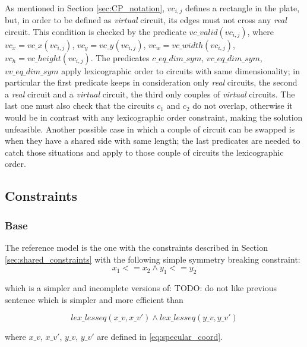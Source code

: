 \hfill \\
As mentioned in Section \ref{sec:CP_notation}, $vc_{i,j}$ defines a rectangle in the plate, but, in order to
be defined as \textit{virtual} circuit, its edges must not cross any \textit{real} circuit.
This condition is checked by the predicate $vc\_valid(vc_{i,j})$, where
$vc_x = vc\_x(vc_{i,j})$, $vc_y = vc\_y(vc_{i,j})$, $vc_w = vc\_width(vc_{i,j})$, $vc_h = vc\_height(vc_{i,j})$.
The predicates $c\_eq\_dim\_sym$, $vc\_eq\_dim\_sym$, $vv\_eq\_dim\_sym$ apply
lexicographic order to circuits with same dimensionality; in particular the first predicate keeps in consideration only
\textit{real} circuits, the second a \textit{real} circuit and a \textit{virtual} circuit, the third only couples of
\textit{virtual} circuits. The last one must also check that the circuits $c_1$ and $c_2$ do not overlap,
otherwise it would be in contrast with any lexicographic order constraint, making the solution unfeasible.
Another possible case in which a couple of circuit can be swapped is when they have a shared side with same length;
the last predicates are needed to catch those situations and apply to those couple of circuits the lexicographic order.


\subsection{Constraints}
\subsubsection{Base} \label{sec:CP_base}
The reference model is the one with the constraints described in Section \ref{sec:shared_constraints}
with the following simple symmetry breaking constraint:
\begin{equation*}
  x_1 <= x_2 \land y_1 <= y_2
\end{equation*}

which is a simpler and incomplete versions of:
\colorbox{BurntOrange}{TODO: do not like previous sentence}
which is simpler and more efficient than

\begin{equation*}
  lex\_lesseq(x\_v, x\_v') \land lex\_lesseq(y\_v, y\_v')
\end{equation*}

where $x\_v$, $x\_v'$, $y\_v$, $y\_v'$ are defined in \ref{eq:specular_coord}.

